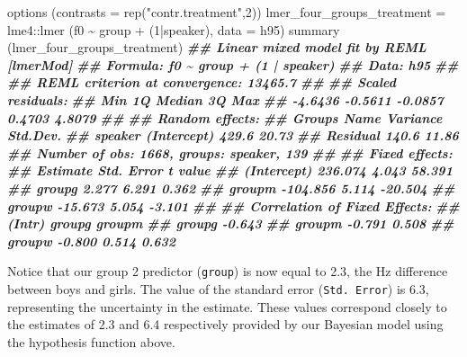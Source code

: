 \documentclass[
]{book}
\newenvironment{Shaded}{\begin{snugshade}}{\end{snugshade}}
\newcommand{\AttributeTok}[1]{\textcolor[rgb]{0.77,0.63,0.00}{#1}}
\newcommand{\DecValTok}[1]{\textcolor[rgb]{0.00,0.00,0.81}{#1}}
\newcommand{\DocumentationTok}[1]{\textcolor[rgb]{0.56,0.35,0.01}{\textbf{\textit{#1}}}}
\newcommand{\FunctionTok}[1]{\textcolor[rgb]{0.00,0.00,0.00}{#1}}
\newcommand{\NormalTok}[1]{#1}
\newcommand{\OtherTok}[1]{\textcolor[rgb]{0.56,0.35,0.01}{#1}}
\newcommand{\SpecialCharTok}[1]{\textcolor[rgb]{0.00,0.00,0.00}{#1}}
\newcommand{\StringTok}[1]{\textcolor[rgb]{0.31,0.60,0.02}{#1}}
\begin{document}
\begin{Shaded}
\begin{Highlighting}[]
\FunctionTok{options}\NormalTok{ (}\AttributeTok{contrasts =} \FunctionTok{rep}\NormalTok{(}\StringTok{"contr.treatment"}\NormalTok{,}\DecValTok{2}\NormalTok{))}
\NormalTok{lmer\_four\_groups\_treatment }\OtherTok{=}\NormalTok{ lme4}\SpecialCharTok{::}\FunctionTok{lmer}\NormalTok{ (f0 }\SpecialCharTok{\textasciitilde{}}\NormalTok{ group }\SpecialCharTok{+}\NormalTok{ (}\DecValTok{1}\SpecialCharTok{|}\NormalTok{speaker), }\AttributeTok{data =}\NormalTok{ h95)}
\FunctionTok{summary}\NormalTok{ (lmer\_four\_groups\_treatment)}
\DocumentationTok{\#\# Linear mixed model fit by REML [\textquotesingle{}lmerMod\textquotesingle{}]}
\DocumentationTok{\#\# Formula: f0 \textasciitilde{} group + (1 | speaker)}
\DocumentationTok{\#\#    Data: h95}
\DocumentationTok{\#\# }
\DocumentationTok{\#\# REML criterion at convergence: 13465.7}
\DocumentationTok{\#\# }
\DocumentationTok{\#\# Scaled residuals: }
\DocumentationTok{\#\#     Min      1Q  Median      3Q     Max }
\DocumentationTok{\#\# {-}4.6436 {-}0.5611 {-}0.0857  0.4703  4.8079 }
\DocumentationTok{\#\# }
\DocumentationTok{\#\# Random effects:}
\DocumentationTok{\#\#  Groups   Name        Variance Std.Dev.}
\DocumentationTok{\#\#  speaker  (Intercept) 429.6    20.73   }
\DocumentationTok{\#\#  Residual             140.6    11.86   }
\DocumentationTok{\#\# Number of obs: 1668, groups:  speaker, 139}
\DocumentationTok{\#\# }
\DocumentationTok{\#\# Fixed effects:}
\DocumentationTok{\#\#             Estimate Std. Error t value}
\DocumentationTok{\#\# (Intercept)  236.074      4.043  58.391}
\DocumentationTok{\#\# groupg         2.277      6.291   0.362}
\DocumentationTok{\#\# groupm      {-}104.856      5.114 {-}20.504}
\DocumentationTok{\#\# groupw       {-}15.673      5.054  {-}3.101}
\DocumentationTok{\#\# }
\DocumentationTok{\#\# Correlation of Fixed Effects:}
\DocumentationTok{\#\#        (Intr) groupg groupm}
\DocumentationTok{\#\# groupg {-}0.643              }
\DocumentationTok{\#\# groupm {-}0.791  0.508       }
\DocumentationTok{\#\# groupw {-}0.800  0.514  0.632}
\end{Highlighting}
\end{Shaded}

Notice that our group 2 predictor (\texttt{group}) is now equal to 2.3, the Hz difference between boys and girls. The value of the standard error (\texttt{Std.\ Error}) is 6.3, representing the uncertainty in the estimate. These values correspond closely to the estimates of 2.3 and 6.4 respectively provided by our Bayesian model using the hypothesis function above.
\end{document}
